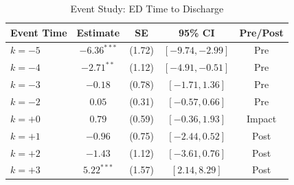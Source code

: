 \begin{table}[htbp]
\centering
\caption{Event Study: ED Time to Discharge}
\label{tab:eventstudy}
\begin{tabular}{lcccc}
\hline\hline
Event Time & Estimate & SE & 95\% CI & Pre/Post \\
\hline
$k = -5$ & $-6.36^{***}$ & (1.72) & $[-9.74, -2.99]$ & Pre \\
$k = -4$ & $-2.71^{**}$ & (1.12) & $[-4.91, -0.51]$ & Pre \\
$k = -3$ & $-0.18$ & (0.78) & $[-1.71, 1.36]$ & Pre \\
$k = -2$ & $0.05$ & (0.31) & $[-0.57, 0.66]$ & Pre \\
$k = +0$ & $0.79$ & (0.59) & $[-0.36, 1.93]$ & Impact \\
$k = +1$ & $-0.96$ & (0.75) & $[-2.44, 0.52]$ & Post \\
$k = +2$ & $-1.43$ & (1.12) & $[-3.61, 0.76]$ & Post \\
$k = +3$ & $5.22^{***}$ & (1.57) & $[2.14, 8.29]$ & Post \\
\hline\hline
\end{tabular}
\par{}
\end{table}
